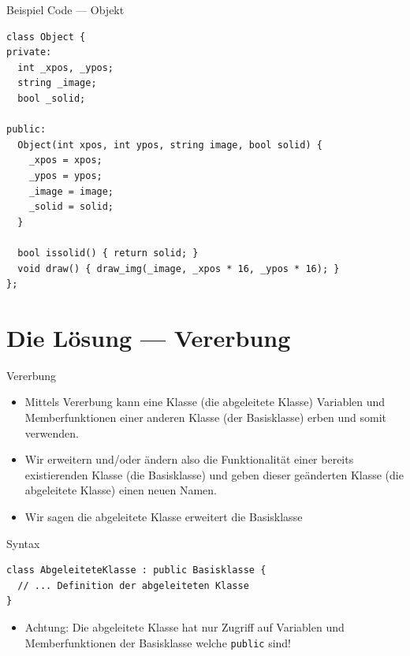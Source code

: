 \documentclass[presentation]{beamer}
\begin{document}
\begin{frame}[label={sec:orga712d93},fragile]{Beispiel Code --- Objekt}
 \begin{verbatim}
class Object {
private:
  int _xpos, _ypos;
  string _image;
  bool _solid;

public:
  Object(int xpos, int ypos, string image, bool solid) {
    _xpos = xpos;
    _ypos = ypos;
    _image = image;
    _solid = solid;
  }

  bool issolid() { return solid; }
  void draw() { draw_img(_image, _xpos * 16, _ypos * 16); }
};
\end{verbatim}
\end{frame}
\section{Die Lösung --- Vererbung}
\label{sec:org9102bbc}
\begin{frame}[label={sec:org9946764},fragile]{Vererbung}
 \begin{itemize}
\item Mittels Vererbung kann eine Klasse (die \alert{abgeleitete Klasse})
Variablen und Memberfunktionen einer anderen Klasse (der
\alert{Basisklasse}) erben und somit verwenden.
\item Wir erweitern und/oder ändern also die Funktionalität einer bereits
existierenden Klasse (die \alert{Basisklasse}) und geben dieser geänderten
Klasse (die \alert{abgeleitete Klasse}) einen neuen Namen.
\item Wir sagen \alert{die abgeleitete Klasse erweitert die Basisklasse}
\end{itemize}
\begin{block}{Syntax}
\begin{verbatim}
class AbgeleiteteKlasse : public Basisklasse {
  // ... Definition der abgeleiteten Klasse
}
\end{verbatim}
\end{block}
\begin{itemize}
\item \alert{Achtung}: Die abgeleitete Klasse hat nur Zugriff auf Variablen und
Memberfunktionen der Basisklasse welche {\color{solarizedYellow}\verb!public!} sind!
\end{itemize}
\end{frame}
\end{document}
